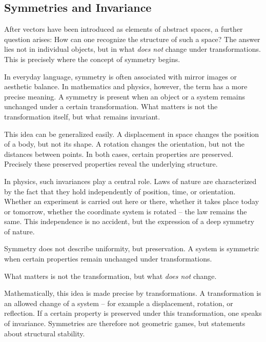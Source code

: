 \subsection{Symmetries and Invariance}

After vectors
have been introduced as elements of abstract spaces,
a further question arises:
How can one recognize the structure of such a space?
The answer lies not in individual objects,
but in what \emph{does not} change
under transformations.
This is precisely where the concept of symmetry begins.

In everyday language,
symmetry is often associated with mirror images
or aesthetic balance.
In mathematics
and physics,
however, the term has a more precise meaning.
A symmetry is present
when an object or a system
remains unchanged under a certain transformation.
What matters is not the transformation itself,
but what remains invariant.

This idea can be generalized easily.
A displacement in space
changes the position of a body,
but not its shape.
A rotation
changes the orientation,
but not the distances between points.
In both cases, certain properties are preserved.
Precisely these preserved properties
reveal the underlying structure.

In physics, such invariances play a central role.
Laws of nature
are characterized by the fact
that they hold independently of position,
time,
or orientation.
Whether an experiment is carried out here or there,
whether it takes place today or tomorrow,
whether the coordinate system is rotated --
the law remains the same.
This independence is no accident,
but the expression of a deep symmetry of nature.

\begin{DidacticBox}
	\label{box:symmetry}
	Symmetry does not describe uniformity,
	but preservation.
	A system is symmetric
	when certain properties remain unchanged under transformations.
	
	What matters is not the transformation,
	but what \emph{does not} change.
\end{DidacticBox}

Mathematically, this idea
is made precise by transformations.
A transformation is an allowed change of a system --
for example a displacement,
rotation,
or reflection.
If a certain property is preserved under this transformation,
one speaks of invariance.
Symmetries are therefore not geometric games,
but statements about structural stability.

